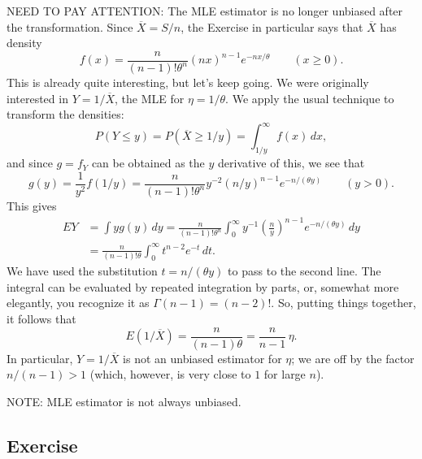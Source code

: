 NEED TO PAY ATTENTION:
The MLE estimator is no longer unbiased after the transformation.
Since $\overline{X}=S/n$, the Exercise in particular says that $\overline{X}$ has density
\begin{equation}
\label{3.3}
f(x) = \frac{n}{(n-1)!\theta^n} (nx)^{n-1} e^{-nx/\theta} \quad\quad (x\ge 0) .
\end{equation}
This is already quite interesting, but let's keep going. We were originally interested in $Y=1/\overline{X}$, the MLE for $\eta=1/\theta$.
We apply the usual technique to transform the densities:
\[
P(Y\le y) = P(\overline{X}\ge 1/y) = \int_{1/y}^{\infty} f(x)\, dx ,
\]
and since $g=f_Y$ can be obtained as the $y$ derivative of this, we see that
\begin{equation}
\label{3.41}
g(y) = \frac{1}{y^2} f(1/y) = \frac{n}{(n-1)!\theta^n} y^{-2}(n/y)^{n-1} e^{-n/(\theta y)} \quad\quad (y>0) .
\end{equation}
This gives
\begin{align*}
EY & = \int y g(y)\, dy = \frac{n}{(n-1)!\theta^n} \int_0^{\infty} y^{-1} \left( \frac{n}{y} \right)^{n-1} e^{-n/(\theta y)}\, dy \\
& = \frac{n}{(n-1)!\theta} \int_0^{\infty} t^{n-2} e^{-t}\, dt .
\end{align*}
We have used the substitution $t=n/(\theta y)$ to pass to the second line. The integral can be evaluated by repeated
integration by parts, or, somewhat more elegantly, you recognize it as $\Gamma(n-1)=(n-2)!$. So, putting things together,
it follows that
\[
E(1/\overline{X}) = \frac{n}{(n-1)\theta} = \frac{n}{n-1}\, \eta .
\]
In particular, $Y=1/\overline{X}$ is not an unbiased estimator for $\eta$; we are off by the factor $n/(n-1)>1$ (which, however,
is very close to $1$ for large $n$).

NOTE: MLE estimator is not always unbiased. 

\newpage

\subsection{Exercise}

